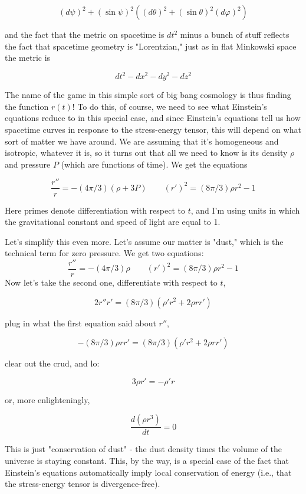 \[(d\psi)^2 + (\sin\psi )^2((d\theta)^2 + (\sin\theta)^2 (d\varphi)^2)\]

and the fact that the metric on spacetime is $dt^2$ minus a bunch of stuff reflects the fact that spacetime geometry is "Lorentzian," just as in flat Minkowski space the metric is

\[dt^2 - dx^2 - dy^2 - dz^2\]

The name of the game in this simple sort of big bang cosmology is thus finding the function $r(t)$! To do this, of course, we need to see what Einstein's equations reduce to in this special case, and since Einstein's equations tell us how spacetime curves in response to the stress-energy tensor, this will depend on what sort of matter we have around. We are assuming that it's homogeneous and isotropic, whatever it is, so it turns out that all we need to know is its density $\rho$ and pressure $P$ (which are functions of time). We get the equations

$$\frac{r''}{r} = -(4\pi/3)(\rho + 3P) \quad \quad (r')^2 = (8\pi/3) \rho r^2 - 1$$

Here primes denote differentiation with respect to $t$, and I'm using units in which the gravitational constant and speed of light are equal to 1.

Let's simplify this even more. Let's assume our matter is "dust," which is the technical term for zero pressure. We get two equations:
\begin{equation}\label{eq:1}
    \frac{r''}{r} = -(4\pi/3)\rho \quad \quad (r')^2 = (8\pi/3) \rho r^2 -1 
\end{equation}
Now let's take the second one, differentiate with respect to $t$,

\[2r''r' = (8\pi/3)(\rho'r^2 + 2\rho rr')\]

plug in what the first equation said about $r''$,

\[-(8\pi/3) \rho r r' = (8\pi/3)(\rho' r^2 + 2\rho r r')\]

clear out the crud, and lo:

\[3\rho r' = -\rho' r\]

or, more enlighteningly,

\[\frac{d(\rho r^3)}{dt} = 0\]

This is just "conservation of dust" - the dust density times the volume of the universe is staying constant. This, by the way, is a special case of the fact that Einstein's equations automatically imply local conservation of energy (i.e., that the stress-energy tensor is divergence-free).

